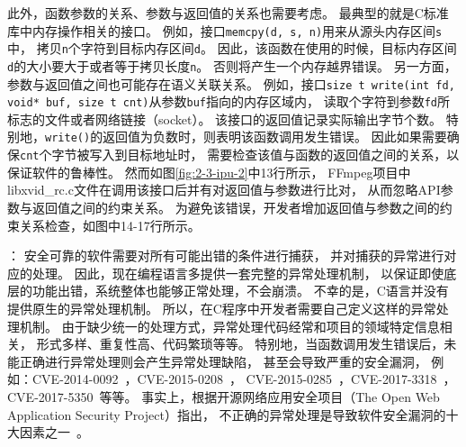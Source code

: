 
此外，函数参数的关系、参数与返回值的关系也需要考虑。
最典型的就是C标准库中内存操作相关的接口。
例如，接口\texttt{memcpy(d, s, n)}用来从源头内存区间\texttt{s}中，
拷贝\texttt{n}个字符到目标内存区间\texttt{d}。
因此，该函数在使用的时候，目标内存区间\texttt{d}的大小要大于或者等于拷贝长度\texttt{n}。
否则将产生一个内存越界错误。
另一方面，参数与返回值之间也可能存在语义关联关系。
例如，接口\texttt{size t write(int fd, void* buf, size t cnt)}从参数\texttt{buf}指向的内存区域内，
读取个字符到参数\texttt{fd}所标志的文件或者网络链接（socket）。
该接口的返回值记录实际输出字节个数。
特别地，\texttt{write()}的返回值为负数时，则表明该函数调用发生错误。
因此如果需要确保\texttt{cnt}个字节被写入到目标地址时，
需要检查该值与函数的返回值之间的关系，以保证软件的鲁棒性。
然而如图\ref{fig:2-3-ipu-2}中13行所示，
FFmpeg项目中libxvid\_rc.c文件在调用该接口后并有对返回值与参数进行比对，
从而忽略API参数与返回值之间的约束关系。
为避免该错误，开发者增加返回值与参数之间的约束关系检查，如图中14-17行所示。

\vspace*{10pt}
\begin{center}
	\noindent{}
\end{center}


：
安全可靠的软件需要对所有可能出错的条件进行捕获，
并对捕获的异常进行对应的处理。
因此，现在编程语言多提供一套完整的异常处理机制，
以保证即使底层的功能出错，系统整体也能够正常处理，不会崩溃。
不幸的是，C语言并没有提供原生的异常处理机制。
所以，在C程序中开发者需要自己定义这样的异常处理机制。
由于缺少统一的处理方式，异常处理代码经常和项目的领域特定信息相关，
形式多样、重复性高、代码繁琐等等。
特别地，当函数调用发生错误后，未能正确进行异常处理则会产生异常处理缺陷，
甚至会导致严重的安全漏洞，
例如：CVE-2014-0092~\cite{CVE-2014-0092}，CVE-2015-0208~\cite{CVE-2015-0208}，
CVE-2015-0285~\cite{CVE-2015-0285}，CVE-2017-3318~\cite{CVE-2017-3318}，
CVE-2017-5350~\cite{CVE-2017-5350}等等。
事实上，根据开源网络应用安全项目（The Open Web Application Security Project）指出，
不正确的异常处理是导致软件安全漏洞的十大因素之一~\cite{07-owasp}。



